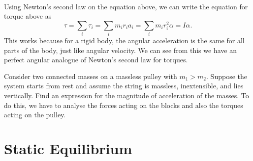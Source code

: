 \documentclass[../newtonian_mechanics.tex]{subfiles}
\begin{document}
        \paragraph{}
        Using Newton's second law on the equation above, we can write the equation for torque above as
        \begin{equation}
            \tau=\sum_i\tau_i=\sum_im_ir_ia_i=\sum_im_ir_i^2\alpha=I\alpha.
        \end{equation}
        This works because for a rigid body, the angular acceleration is the same for all parts of the body, just like angular velocity.
        We can see from this we have an perfect angular analogue of Newton's second law for torques.
        \begin{example}
            Consider two connected masses on a massless pulley with $m_1>m_2$.
            Suppose the system starts from rest and assume the string is massless, inextensible, and lies vertically.
            Find an expression for the magnitude of acceleration of the masses.
            To do this, we have to analyse the forces acting on the blocks and also the torques acting on the pulley.
        \end{example}

    \section{Static Equilibrium}
\end{document}
